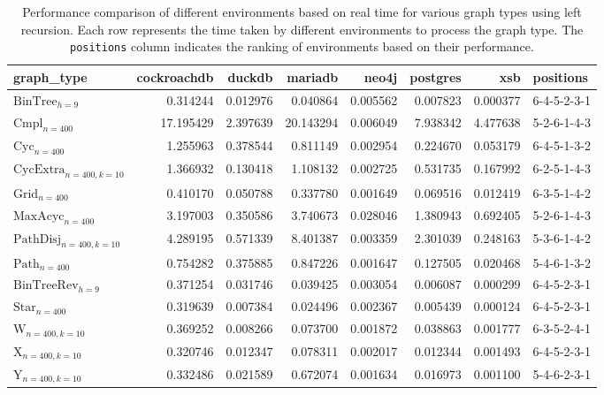 \begin{table}
\caption{Performance comparison of different environments based on real time for various graph types using left recursion. Each row represents the time taken by different environments to process the graph type. The \texttt{positions} column indicates the ranking of environments based on their performance.}
\label{table:results}
\begin{tabular}{lrrrrrrl}
\toprule
graph\_type & cockroachdb & duckdb & mariadb & neo4j & postgres & xsb & positions \\
\midrule
$\text{BinTree}_{h=9}$ & 0.314244 & 0.012976 & 0.040864 & 0.005562 & 0.007823 & 0.000377 & 6-4-5-2-3-1 \\
$\text{Cmpl}_{n=400}$ & 17.195429 & 2.397639 & 20.143294 & 0.006049 & 7.938342 & 4.477638 & 5-2-6-1-4-3 \\
$\text{Cyc}_{n=400}$ & 1.255963 & 0.378544 & 0.811149 & 0.002954 & 0.224670 & 0.053179 & 6-4-5-1-3-2 \\
$\text{CycExtra}_{n=400,k=10}$ & 1.366932 & 0.130418 & 1.108132 & 0.002725 & 0.531735 & 0.167992 & 6-2-5-1-4-3 \\
$\text{Grid}_{n=400}$ & 0.410170 & 0.050788 & 0.337780 & 0.001649 & 0.069516 & 0.012419 & 6-3-5-1-4-2 \\
$\text{MaxAcyc}_{n=400}$ & 3.197003 & 0.350586 & 3.740673 & 0.028046 & 1.380943 & 0.692405 & 5-2-6-1-4-3 \\
$\text{PathDisj}_{n=400,k=10}$ & 4.289195 & 0.571339 & 8.401387 & 0.003359 & 2.301039 & 0.248163 & 5-3-6-1-4-2 \\
$\text{Path}_{n=400}$ & 0.754282 & 0.375885 & 0.847226 & 0.001647 & 0.127505 & 0.020468 & 5-4-6-1-3-2 \\
$\text{BinTreeRev}_{h=9}$ & 0.371254 & 0.031746 & 0.039425 & 0.003054 & 0.006087 & 0.000299 & 6-4-5-2-3-1 \\
$\text{Star}_{n=400}$ & 0.319639 & 0.007384 & 0.024496 & 0.002367 & 0.005439 & 0.000124 & 6-4-5-2-3-1 \\
$\text{W}_{n=400,k=10}$ & 0.369252 & 0.008266 & 0.073700 & 0.001872 & 0.038863 & 0.001777 & 6-3-5-2-4-1 \\
$\text{X}_{n=400, k=10}$ & 0.320746 & 0.012347 & 0.078311 & 0.002017 & 0.012344 & 0.001493 & 6-4-5-2-3-1 \\
$\text{Y}_{n=400,k=10}$ & 0.332486 & 0.021589 & 0.672074 & 0.001634 & 0.016973 & 0.001100 & 5-4-6-2-3-1 \\
\bottomrule
\end{tabular}
\end{table}

